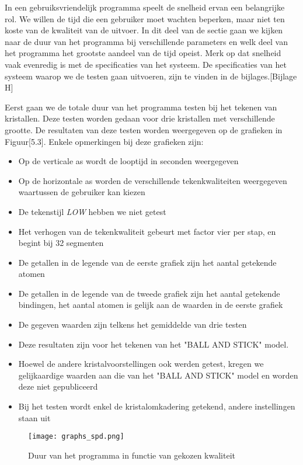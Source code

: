In een gebruiksvriendelijk programma speelt de snelheid ervan een belangrijke rol. We willen de tijd die een gebruiker moet wachten beperken, maar niet ten koste van de kwaliteit van de uitvoer. In dit deel van de sectie gaan we kijken naar de duur van het programma bij verschillende parameters en welk deel van het programma het grootste aandeel van de tijd opeist. Merk op dat snelheid vaak evenredig is met de specificaties van het systeem. De specificaties van het systeem waarop we de testen gaan uitvoeren, zijn te vinden in de bijlages.[Bijlage H]  
\par
Eerst gaan we de totale duur van het programma testen bij het tekenen van kristallen. Deze testen worden gedaan voor drie kristallen met verschillende grootte. De resultaten van deze testen worden weergegeven op de grafieken in Figuur[5.3]. Enkele opmerkingen bij deze grafieken zijn:
\begin{itemize}
\item Op de verticale as wordt de looptijd in seconden weergegeven
\item Op de horizontale as worden de verschillende tekenkwaliteiten weergegeven waartussen de gebruiker kan kiezen 
\item De tekenstijl \textit{LOW} hebben we niet getest
\item Het verhogen van de tekenkwaliteit gebeurt met factor vier per stap, en begint bij 32 segmenten
\item De getallen in de legende van de eerste grafiek zijn het aantal getekende atomen
\item De getallen in de legende van de tweede grafiek zijn het aantal getekende bindingen, het aantal atomen is gelijk aan de waarden in de eerste grafiek 
\item De gegeven waarden zijn telkens het gemiddelde van drie testen 
\item Deze resultaten zijn voor het tekenen van het "BALL AND STICK" model.
\item Hoewel de andere kristalvoorstellingen ook werden getest, kregen we gelijkaardige waarden aan die van het "BALL AND STICK" model en worden deze niet gepubliceerd
\item Bij het testen wordt enkel de kristalomkadering getekend, andere instellingen staan uit 

\end{itemize}

\begin{figure}[H]
\begin{center}
\texttt{[image: graphs\_spd.png]}
\caption{Duur van het programma in functie van gekozen kwaliteit}
\end{center}
\end{figure}

